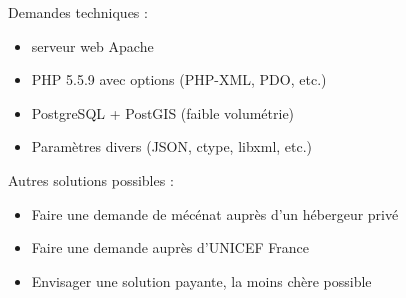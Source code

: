 \begin{frame}
	Demandes techniques :
	\begin{itemize}
		\item serveur web Apache
		\item PHP 5.5.9 avec options (PHP-XML, PDO, etc.) 
		\item PostgreSQL + PostGIS (faible volumétrie)
		\item Paramètres divers (JSON, ctype, libxml, etc.)
	\end{itemize}
\end{frame}

\begin{frame} 
    Autres solutions possibles :
      \begin{itemize}
        \item Faire une demande de mécénat auprès d'un hébergeur privé
        \item Faire une demande auprès d'UNICEF France
        \item Envisager une solution payante, la moins chère possible
      \end{itemize}
\end{frame}

